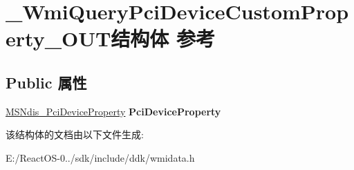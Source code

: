 \hypertarget{struct___wmi_query_pci_device_custom_property___o_u_t}{}\section{\+\_\+\+Wmi\+Query\+Pci\+Device\+Custom\+Property\+\_\+\+O\+U\+T结构体 参考}
\label{struct___wmi_query_pci_device_custom_property___o_u_t}
\subsection*{Public 属性}
\begin{DoxyCompactItemize}
\item 
\mbox{\label{struct___wmi_query_pci_device_custom_property___o_u_t_a867091c1c8f90169abc56c1d8ef247ea}} 
\hyperlink{struct___m_s_ndis___pci_device_property}{M\+S\+Ndis\+\_\+\+Pci\+Device\+Property} {\bfseries Pci\+Device\+Property}
\end{DoxyCompactItemize}


该结构体的文档由以下文件生成\+:\begin{DoxyCompactItemize}
\item 
E\+:/\+React\+O\+S-\/0../sdk/include/ddk/wmidata.\+h\end{DoxyCompactItemize}
